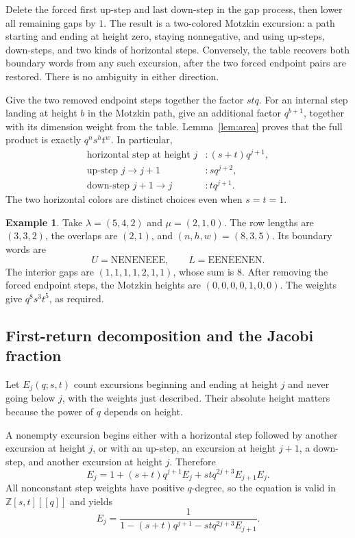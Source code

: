 \documentclass[11pt,letterpaper]{article}
\numberwithin{equation}{section}
\theoremstyle{definition}
\newtheorem{example}[theorem]{Example}
\newcommand{\Z}{\mathbb Z}
\begin{document}
Delete the forced first up-step and last down-step in the gap process,
then lower all remaining gaps by $1$. The result is a two-colored Motzkin
excursion: a path starting and ending at height zero, staying nonnegative,
and using up-steps, down-steps, and two kinds of horizontal steps.
Conversely, the table recovers both boundary words from any such excursion,
after the two forced endpoint pairs are restored. There is no ambiguity in
either direction.

Give the two removed endpoint steps together the factor $stq$. For an
internal step landing at height $b$ in the Motzkin path, give an additional
factor $q^{b+1}$, together with its dimension weight from the table.
Lemma~\ref{lem:area} proves that the full product is exactly $q^ns^ht^w$.
In particular,
\begin{align*}
 \text{horizontal step at height }j &: (s+t)q^{j+1},\\
 \text{up-step }j\longrightarrow j+1 &: sq^{j+2},\\
 \text{down-step }j+1\longrightarrow j &: tq^{j+1}.
\end{align*}
The two horizontal colors are distinct choices even when $s=t=1$.

\begin{example}
Take $\lambda=(5,4,2)$ and $\mu=(2,1,0)$. The row lengths are $(3,3,2)$,
the overlaps are $(2,1)$, and $(n,h,w)=(8,3,5)$. Its boundary words are
\[
 U=\mathrm{NENENEEE},\qquad L=\mathrm{EENEENEN}.
\]
The interior gaps are $(1,1,1,1,2,1,1)$, whose sum is $8$. After removing
the forced endpoint steps, the Motzkin heights are
$(0,0,0,0,1,0,0)$. The weights give $q^8s^3t^5$, as required.
\end{example}

\subsection{First-return decomposition and the Jacobi fraction}
Let $E_j(q;s,t)$ count excursions beginning and ending at height $j$ and
never going below $j$, with the weights just described. Their absolute
height matters because the power of $q$ depends on height.

A nonempty excursion begins either with a horizontal step followed by
another excursion at height $j$, or with an up-step, an excursion at height
$j+1$, a down-step, and another excursion at height $j$. Therefore
\[
 E_j=1+(s+t)q^{j+1}E_j+stq^{2j+3}E_{j+1}E_j.
\]
All nonconstant step weights have positive $q$-degree, so the equation is
valid in $\Z[s,t][[q]]$ and yields
\begin{equation}
 E_j=\frac{1}{1-(s+t)q^{j+1}-stq^{2j+3}E_{j+1}}.
 \label{eq:Erecurrence}
\end{equation}
\end{document}
